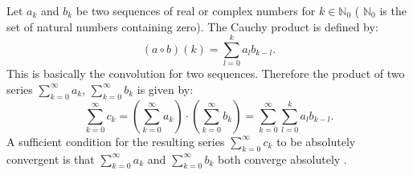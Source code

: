 \documentclass[12pt]{article}
\begin{document}
Let $a_k$ and $b_k$ be two sequences of real or complex numbers for 
$k \in {\mathbb N}_0$ ( ${\mathbb N}_0$ is the set of natural numbers containing zero).
The Cauchy product is defined by:
\begin{equation}
(a \circ b)(k) = \sum_{l=0}^k a_l b_{k-l}.
\end{equation}
This is basically the convolution for two sequences.
Therefore the product of two series $\sum_{k=0}^{\infty} a_k$, $\sum_{k=0}^{\infty} b_k$ is given by:
\begin{equation}
\sum_{k=0}^{\infty} c_k = \left(\sum_{k=0}^{\infty} a_k \right)\cdot \left(\sum_{k=0}^{\infty} b_k \right) =
\sum_{k=0}^{\infty} \sum_{l=0}^k a_l b_{k-l}.
\end{equation}
A sufficient condition for the resulting series $\sum_{k=0}^{\infty} c_k$ to be absolutely convergent is that $\sum_{k=0}^{\infty} a_k$ and $\sum_{k=0}^{\infty} b_k$ both converge absolutely .
\end{document}
